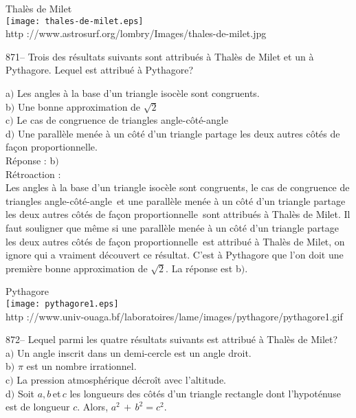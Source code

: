 ﻿\documentclass[letterpaper, 12pt]{article}
\begin{document}
        \begin{center}
        Thal\`es de Milet\\
    \texttt{[image: thales-de-milet.eps]}\\
        {\footnotesize http
://www.astrosurf.org/lombry/Images/thales-de-milet.jpg}
    \end{center}

871-- Trois des r\'esultats suivants sont attribu\'es \`a Thal\`es
de Milet et un \`a Pythagore. Lequel est attribu\'e \`a Pythagore?

a$)$ Les angles \`a la base d'un triangle isoc\`ele sont congruents. \\
b$)$ Une bonne approximation de $\sqrt2$ \\
c$)$ Le cas de congruence de triangles angle-c\^ot\'e-angle \\
d$)$ Une parall\`ele men\'ee \`a un c\^ot\'e d'un triangle partage les deux
autres c\^ot\'es de fa\c con proportionnelle. \\

R\'eponse : b$)$\\

R\'etroaction : \\
\og Les angles \`a la base d'un triangle isoc\`ele sont
congruents\fg , \og le cas de congruence de triangles
angle-c\^ot\'e-angle\fg\ et \og une parall\`ele men\'ee \`a un
c\^ot\'e d'un triangle partage les deux autres c\^ot\'es de fa\c con
proportionnelle\fg\ sont attribu\'es \`a Thal\`es de Milet.  Il faut
souligner que m\^eme si \og une parall\`ele men\'ee \`a un c\^ot\'e
d'un triangle partage les deux autres c\^ot\'es de fa\c con
proportionnelle\fg\ est attribu\'e \`a Thal\`es de Milet, on ignore
qui a vraiment d\'ecouvert ce r\'esultat. C'est \`a Pythagore que
l'on doit une premi\`ere bonne approximation de $\sqrt2$. La
r\'eponse est b$)$.

        \begin{center}
        Pythagore\\
    \texttt{[image: pythagore1.eps]}\\
        {\footnotesize http
://www.univ-ouaga.bf/laboratoires/lame/images/pythagore/pythagore1.gif}
    \end{center}

872-- Lequel parmi les quatre r\'esultats suivants est attribu\'e \`a
Thal\`es de Milet?\\

a$)$ Un angle inscrit dans un demi-cercle est un angle droit. \\
b$)$ $\pi$ est un nombre irrationnel. \\
c$)$ La pression atmosph\'erique d\'ecro\^it avec l'altitude. \\
d$)$ Soit $a,b\,$et$\,c$ les longueurs des c\^ot\'es d'un triangle rectangle
dont l'hypot\'enuse est de longueur $c$.  Alors, $a^2\,+\,b^2=c^2$.\\
\end{document}
